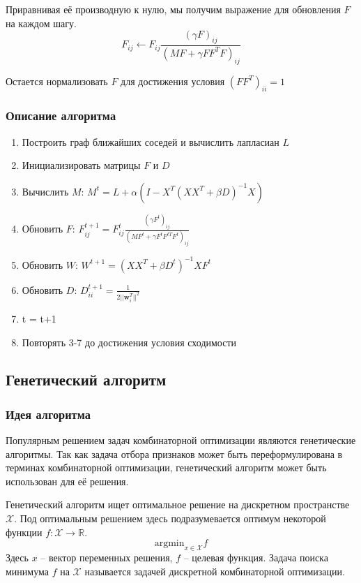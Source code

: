 Приравнивая её производную к нулю, мы получим выражение для обновления $F$ на каждом шагу.
\begin{equation}
	F_{ij} \leftarrow F_{ij} \frac{(\gamma F)_{ij}}{(MF + \gamma F F^T F)_{ij}}
\end{equation}

Остается нормализовать $F$ для достижения условия $(F F^T)_{ii} = 1 $

\subsubsection{Описание алгоритма}
\begin{enumerate}
	\item Построить граф ближайших соседей и вычислить лапласиан $L$
	\item Инициализировать матрицы $F$ и $D$
	\item Вычислить $M$: $M^t = L + \alpha(I - X^T(X X^T + \beta D)^{-1} X)$
	\item Обновить $F$: $F_{ij}^{t+1} = F_{ij}^t \frac{(\gamma F^t)_{ij}}{(MF^t + \gamma F^t F^{tT} F^t)_{ij}}$
	\item Обновить $W$: $ W^{t+1} = (XX^T + \beta D^t)^{-1} X F^t$
	\item Обновить $D$: $D_{ii}^{t+1} = \frac{1}{2 ||\mathbf{w}_i^T||^2}$
	\item t = t+1
	\item Повторять 3-7 до достижения условия сходимости
\end{enumerate}

\subsection{Генетический алгоритм}
\subsubsection{Идея алгоритма}
Популярным решением задач комбинаторной оптимизации являются генетические алгоритмы. Так как задача отбора признаков может быть переформулирована в терминах комбинаторной оптимизации, генетический алгоритм может быть использован для её решения.

Генетический алгоритм ищет оптимальное решение на дискретном пространстве $\mathcal{X}$. Под оптимальным решением здесь подразумевается оптимум некоторой функции $f : \mathcal{X} \rightarrow \mathbb{R}$.
\begin{equation}
	\text{argmin}_{x \in \mathcal{X}} f
\end{equation}
Здесь $x$ -- вектор переменных решения, $f$ -- целевая функция. Задача поиска минимума $f$ на $\mathcal{X}$ называется задачей дискретной комбинаторной оптимизации. 

